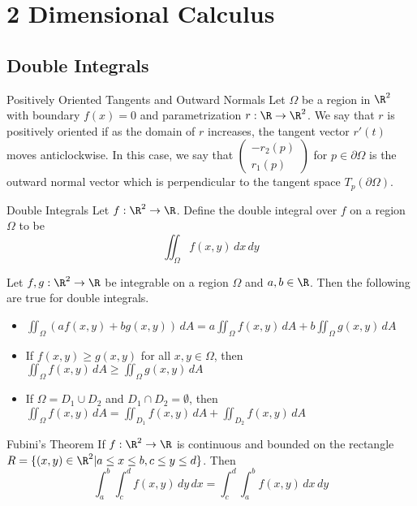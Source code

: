 \documentclass[a4paper]{article}
\begin{document}
\pagebreak

\section{2 Dimensional Calculus}
\subsection{Double Integrals}
\begin{defn}{Positively Oriented Tangents and Outward Normals}{} Let $\Omega$ be a region in $\R^2$ with boundary $f(x)=0$ and parametrization $r:\R\to\R^2$. We say that $r$ is positively oriented if as the domain of $r$ increases, the tangent vector $r'(t)$ moves anticlockwise. In this case, we say that $\begin{pmatrix}-r_2(p)\\r_1(p)\end{pmatrix}$ for $p\in\partial\Omega$ is the outward normal vector which is perpendicular to the tangent space $T_p(\partial\Omega)$. 
\end{defn}

\begin{defn}{Double Integrals}{} Let $f:\R^2\to\R$. Define the double integral over $f$ on a region $\Omega$ to be $$\iint_\Omega f(x,y)\,dx\,dy$$
\end{defn}

\begin{prp}{}{} Let $f,g:\R^2\to\R$ be integrable on a region $\Omega$ and $a,b\in\R$. Then the following are true for double integrals. 
\begin{itemize}
\item $\iint_\Omega(af(x,y)+bg(x,y))\,dA=a\iint_\Omega f(x,y)\,dA+b\iint_\Omega g(x,y)\,dA$
\item If $f(x,y)\geq g(x,y)$ for all $x,y\in\Omega$, then $\iint_\Omega f(x,y)\,dA\geq\iint_\Omega g(x,y)\,dA$
\item If $\Omega=D_1\cup D_2$ and $D_1\cap D_2=\emptyset$, then $\iint_\Omega f(x,y)\,dA=\iint_{D_1}f(x,y)\,dA+\iint_{D_2}f(x,y)\,dA$
\end{itemize}
\end{prp}

\begin{prp}{Fubini's Theorem}{} If $f:\R^2\to\R$ is continuous and bounded on the rectangle $R=\{(x,y)\in\R^2|a\leq x\leq b, c\leq y\leq d\}$. Then $$\int_a^b\int_c^df(x,y)\,dy\,dx=\int_c^d\int_a^bf(x,y)\,dx\,dy$$
\end{prp}
\end{document}
